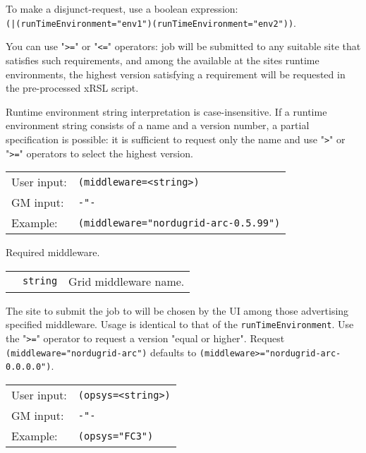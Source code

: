   To make a disjunct-request, use a boolean expression:\\
  \verb#(|(runTimeEnvironment="env1")(runTimeEnvironment="env2"))#.

  You can use "\verb#>=#" or "\verb#<=#" operators: job will be submitted to
  any suitable site that satisfies such requirements, and among the available at the sites
  runtime environments, the highest version satisfying a requirement will be requested
  in the pre-processed xRSL script.

  Runtime environment string interpretation is
  case-insensitive.  If a runtime environment string consists of a name
  and a version number, a partial specification is possible: it is sufficient
  to request only the name and use "\verb#>#" or "\verb#>=#" operators to select the highest version.

  \hspace*{0.5cm}
  \begin{shaded}
  \end{shaded}
  \begin{tabular}{lp{13cm}}
    User input:&\verb#(middleware=<string>)#\\
    GM input:&\verb#-"-#\\
    Example:&\verb#(middleware="nordugrid-arc-0.5.99")#\\
  \end{tabular}

  Required middleware.

  \begin{tabular}{llp{10cm}}
    \hspace*{1cm}&\texttt{string} & Grid middleware name.\\
  \end{tabular}

  The site to submit the job to will be chosen by the UI among those
  advertising specified middleware. Usage is identical to that of the
  \texttt{runTimeEnvironment}. Use the "\verb#>=#" operator to
  request a version "equal or higher". Request
  \texttt{(middleware="nordugrid-arc")} defaults to
  \verb#(middleware>="nordugrid-arc-0.0.0.0")#.

  \hspace*{0.5cm}
  \begin{shaded}
  \end{shaded}
  \begin{tabular}{lp{13cm}}
    User input:&\verb#(opsys=<string>)#\\
    GM input:&\verb#-"-#\\
    Example:&\verb#(opsys="FC3")#\\
  \end{tabular}

